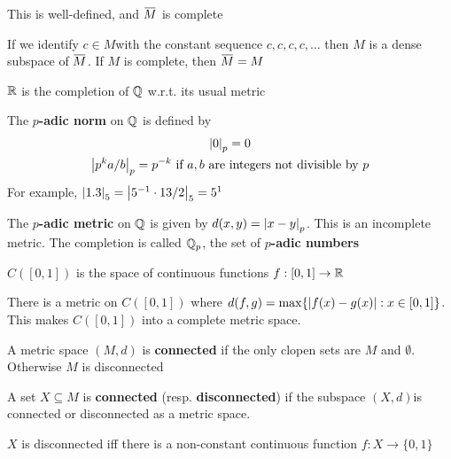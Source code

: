 \documentclass[11pt]{article}
\begin{document}
\begin{proposition}[]
This is well-defined, and \(\barM\) is complete
\end{proposition}

\begin{proposition}[]
If we identify \(c\in M\)with the constant sequence \(c,c,c,c,\dots\) then \(M\) is a dense subspace
of \(\barM\). If \(M\) is complete, then \(\barM=M\)
\end{proposition}

\begin{examplle}[]
\(\mathbb{R}\) is the completion of \(\mathbb{Q}\) w.r.t. its usual metric
\end{examplle}

\begin{examplle}[]
The \textbf{\(p\)-adic norm} on \(\mathbb{Q}\) is defined by
\begin{gather*}
\abs{0}_p=0\\
\abs{p^ka/b}_p=p^{-k}\text{ if }a,b\text{ are integers not divisible by }p
\end{gather*}
For example, \(\abs{1.3}_5=\abs{5^{-1}\cdot 13/2}_5=5^1\)

The \textbf{\(p\)-adic metric} on \(\mathbb{Q}\) is given by \(d(x,y)=\abs{x-y}_p\). This is an incomplete metric.
The completion is called \(\mathbb{Q}_p\), the set of \textbf{\(p\)-adic numbers}
\end{examplle}

\begin{definition}[]
\(C([0,1])\) is the space of continuous functions \(f:[0,1]\to\mathbb{R}\)
\end{definition}

\begin{proposition}[]
There is a metric on \(C([0,1])\) where \(d(f,g)=\max\{\abs{f(x)-g(x)}:x\in[0,1]\}\). This
makes \(C([0,1])\) into a complete metric space.
\end{proposition}

\begin{definition}[]
A metric space \((M,d)\) is \textbf{connected} if the only clopen sets are \(M\) and \(\emptyset\).
Otherwise \(M\) is disconnected
\end{definition}

\begin{definition}[]
A set \(X\subseteq M\) is \textbf{connected} (resp. \textbf{disconnected}) if the subspace \((X,d)\)is connected or
disconnected as a metric space.
\end{definition}

\begin{proposition}[]
\(X\) is disconnected iff there is a non-constant continuous function \(f:X\to\{0,1\}\)
\end{proposition}
\end{document}
